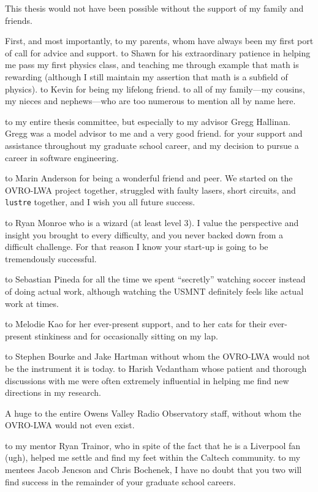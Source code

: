 \documentclass[12pt]{caltech_thesis}
\begin{document}
\begin{acknowledgements}
    This thesis would not have been possible without the support of my family and friends.

    First, and most importantly, \ty to my parents, whom have always been my first port of call for
    advice and support.  \Ty to Shawn for his extraordinary patience in helping me pass my first
    physics class, and teaching me through example that math is rewarding (although I still maintain
    my assertion that math is a subfield of physics).  \Ty to Kevin for being my lifelong friend.
    \Ty to all of my family---my cousins, my nieces and nephews---who are too numerous to mention
    all by name here.

    \Ty to my entire thesis committee, but especially to my advisor Gregg Hallinan. Gregg was a
    model advisor to me and a very good friend. \Ty for your support and assistance throughout my
    graduate school career, and my decision to pursue a career in software engineering.

    \Ty to Marin Anderson for being a wonderful friend and peer. We started on the OVRO-LWA project
    together, struggled with faulty lasers, short circuits, and \texttt{lustre} together, and I wish
    you all future success.

    \Ty to Ryan Monroe who is a wizard (at least level 3). I value the perspective and insight you
    brought to every difficulty, and you never backed down from a difficult challenge. For that
    reason I know your start-up is going to be tremendously successful.

    \Ty to Sebastian Pineda for all the time we spent ``secretly'' watching soccer instead of doing
    actual work, although watching the USMNT definitely feels like actual work at times.
    
    \Ty to Melodie Kao for her ever-present support, and \ty to her cats for their ever-present
    stinkiness and for occasionally sitting on my lap.
    
    \Ty to Stephen Bourke and Jake Hartman without whom the OVRO-LWA would not be the instrument it
    is today. \Ty to Harish Vedantham whose patient and thorough discussions with me were often
    extremely influential in helping me find new directions in my research.

    A huge \ty to the entire Owens Valley Radio Observatory staff, without whom the OVRO-LWA would
    not even exist.

    \Ty to my mentor Ryan Trainor, who in spite of the fact that he is a Liverpool fan (ugh), helped
    me settle and find my feet within the Caltech community. \Ty to my mentees Jacob Jencson and
    Chris Bochenek, I have no doubt that you two will find success in the remainder of your graduate
    school careers.


\end{acknowledgements}
\end{document}

